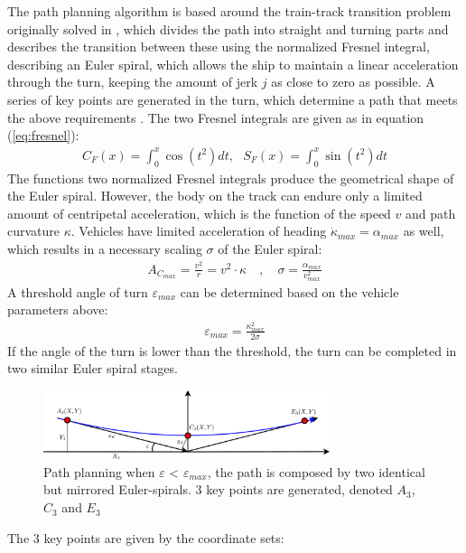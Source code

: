 \documentclass{ifacconf}
\begin{document}
The path planning algorithm is based around the train-track transition problem originally solved in \citep{Art:1}, which divides the path into straight and turning parts and describes the transition between these using the normalized Fresnel integral, describing an Euler spiral, which allows the ship to maintain a linear acceleration through the turn, keeping the amount of jerk $j$ as close to zero as possible. A series of key points are generated in the turn, which determine a path that meets the above requirements \citep{Art:2}. The two Fresnel integrals are given as in equation (\ref{eq:fresnel}):
\begin{align}
C_F(x) = \int_0^x \cos(t^2)dt,\,\,\,\,S_F(x) = \int_0^x \sin(t^2)dt
\label{eq:fresnel}
\end{align}
The functions two normalized Fresnel integrals produce the geometrical shape of the Euler spiral. However, the body on the track can endure only a limited amount of centripetal acceleration, which is the function of the speed $v$ and path curvature $\kappa$. Vehicles have limited acceleration of heading $\dot{\kappa}_{max} = \alpha_{max}$ as well, which results in a necessary scaling $\sigma$ of the Euler spiral:
\begin{align}
A_{C_{max}} = \frac{v^2}{r} = v^2 \cdot \kappa \quad , \quad \sigma = \frac{\alpha_{max}}{v^2_{max}}
\end{align}
A threshold angle of turn $\varepsilon_{max}$ can be determined based on the vehicle parameters above:
\begin{align}
\varepsilon_{max} = \frac{\kappa^2_{max}}{2\sigma}
\end{align}
If the angle of the turn is lower than the threshold, the turn can be completed in two similar Euler spiral stages.
\begin{figure}
	\begin{center}
		\includegraphics[width=8.4cm]{img/3Points} %
		\caption{Path planning when $\varepsilon$ < $\varepsilon_{max}$, the path is composed by two identical but mirrored Euler-spirals. 3 key points are generated, denoted $A_3$, $C_3$ and $E_3$}
		\label{fig:3points}
	\end{center}
\end{figure}
The 3 key points are given by the coordinate sets:
\end{document}
